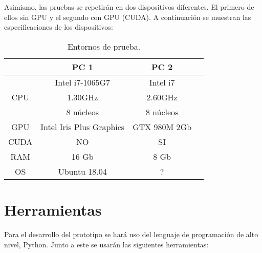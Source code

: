 Asimismo, las pruebas se repetirán en dos dispositivos diferentes. El primero de ellos sin GPU y el segundo con GPU (CUDA). A continuación se muestran las especificaciones de los dispositivos:

\begin{table}[h!]
	\begin{center}
		\begin{tabular}{ |c|c|c|c| } 
			\hline
			 & PC 1 & PC 2 \\
			\hline
			\multirow{3}{4em}{CPU} & Intel i7-1065G7 & Intel i7 \\ 
			& 1.30GHz & 2.60GHz \\ 
			& 8 núcleos & 8 núcleos \\ 
			\hline
			GPU & Intel Iris Plus Graphics  & GTX 980M 2Gb \\
			\hline
			CUDA & NO  & SI \\
			\hline
			RAM & 16 Gb & 8 Gb \\
			\hline
			OS & Ubuntu 18.04 & ? \\
			\hline
		\end{tabular}
		\caption{Entornos de prueba.}
		\label{tab:table1}
	\end{center}
\end{table}

\vspace{-0.8cm}

\section*{Herramientas}

Para el desarrollo del prototipo se hará uso del lenguaje de programación de alto nivel, Python. Junto a este se usarán las siguientes herramientas:

